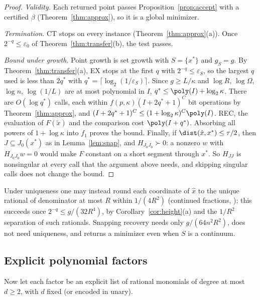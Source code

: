 \begin{proof}
\emph{Validity.} Each returned point passes Proposition~\ref{prop:accept}
with a certified $\beta$ (Theorem~\ref{thm:approx}), so it is a global
minimizer.

\emph{Termination.} CT stops on every instance
(Theorem~\ref{thm:approx}(a)). Once $2^{-q}\le\varepsilon_0$ of
Theorem~\ref{thm:transfer}(b), the test passes.

\emph{Bound under growth.} Point growth is set growth with $S=\{x^*\}$ and
$g_S=g$. By Theorem~\ref{thm:transfer}(a), EX stops at the first $q$ with
$2^{-q}\le\varepsilon_S$, so the largest $q$ used is less than
$2q^*$ with $q^*=\lceil\log_2(1/\varepsilon_S)\rceil$. Since $g\ge L/\kappa$
and $\log R$, $\log \Omega$, $\log n$, $\log(1/L)$ are at most polynomial in $I$,
$q^*\le\poly(I)+\log_2\kappa$. There are $O(\log q^*)$ calls, each within
$f(p,\kappa)(I+2q^*+1)^C$ bit operations by Theorem~\ref{thm:approx}, and
$(I+2q^*+1)^C\le(1+\log_2\kappa)^{C}\poly(I)$. REC, the evaluation of
$F(\tilde x)$ and the comparison cost $\poly(I+q^*)$. Absorbing all powers
of $1+\log\kappa$ into $f_1$ proves the bound. Finally, if
$\dist(\hat x,x^*)\le\tau/2$, then $J\subseteq J_0(x^*)$ as in
Lemma~\ref{lem:snap}, and $H_{J_0J_0}\succ0$: a nonzero $w$ with
$H_{J_0J_0}w=0$ would make $F$ constant on a short segment through $x^*$.
So $H_{JJ}$ is nonsingular at every call that the argument above needs, and
skipping singular calls does not change the bound.
\end{proof}

\begin{remark}\label{rem:cf}
Under uniqueness one may instead round each coordinate of $\hat x$ to the
unique rational of denominator at most $R$ within $1/(4R^2)$ (continued
fractions, \cite[Theorem~5.1.9]{GrotschelLovaszSchrijver1988}); this succeeds
once $2^{-q}\le g/(32R^4)$, by Corollary~\ref{cor:height}(a) and the
$1/R^2$ separation of such rationals. Snapping recovery needs only
$g/(64n^2R^2)$, does not need uniqueness, and returns a minimizer even when
$S$ is a continuum.
\end{remark}

\subsection{Explicit polynomial factors}\label{sec:polynomial}

Now let each factor be an explicit list of rational monomials of degree at
most $d\ge2$, with $d$ fixed (or encoded in unary).


